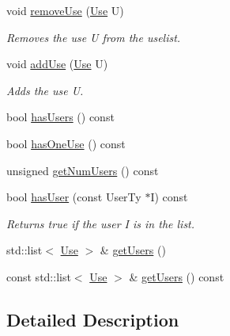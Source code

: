 \begin{DoxyCompactItemize}
\item 
\mbox{\label{classglow_1_1_use_def_a8ad43846727ec8ca1d90d6bfe78e42aa}} 
void \hyperlink{classglow_1_1_use_def_a8ad43846727ec8ca1d90d6bfe78e42aa}{remove\+Use} (\hyperlink{structglow_1_1_use}{Use} U)
\begin{DoxyCompactList}\small\item\em Removes the use {\ttfamily U} from the uselist. \end{DoxyCompactList}\item 
\mbox{\label{classglow_1_1_use_def_af4c271b975499255e48b0ba1f050acf1}} 
void \hyperlink{classglow_1_1_use_def_af4c271b975499255e48b0ba1f050acf1}{add\+Use} (\hyperlink{structglow_1_1_use}{Use} U)
\begin{DoxyCompactList}\small\item\em Adds the use {\ttfamily U}. \end{DoxyCompactList}\item 
bool \hyperlink{classglow_1_1_use_def_a57e259466504c1b589ff4f84dc5bcbb9}{has\+Users} () const
\item 
bool \hyperlink{classglow_1_1_use_def_aff3381f7085f27c6053426920b42147c}{has\+One\+Use} () const
\item 
unsigned \hyperlink{classglow_1_1_use_def_aee4e20812def8d2a62db301527e8e9e8}{get\+Num\+Users} () const
\item 
\mbox{\label{classglow_1_1_use_def_a9b0a173f02a51a77ce3e9e342ae416c9}} 
bool \hyperlink{classglow_1_1_use_def_a9b0a173f02a51a77ce3e9e342ae416c9}{has\+User} (const User\+Ty $\ast$I) const
\begin{DoxyCompactList}\small\item\em Returns true if the user {\ttfamily I} is in the list. \end{DoxyCompactList}\item 
std\+::list$<$ \hyperlink{structglow_1_1_use}{Use} $>$ \& \hyperlink{classglow_1_1_use_def_a36287064b16f4c2569988d2b795cd9b7}{get\+Users} ()
\item 
const std\+::list$<$ \hyperlink{structglow_1_1_use}{Use} $>$ \& \hyperlink{classglow_1_1_use_def_a15a07afe24f9546f4ea841ffefe46508}{get\+Users} () const
\end{DoxyCompactItemize}


\subsection{Detailed Description}
